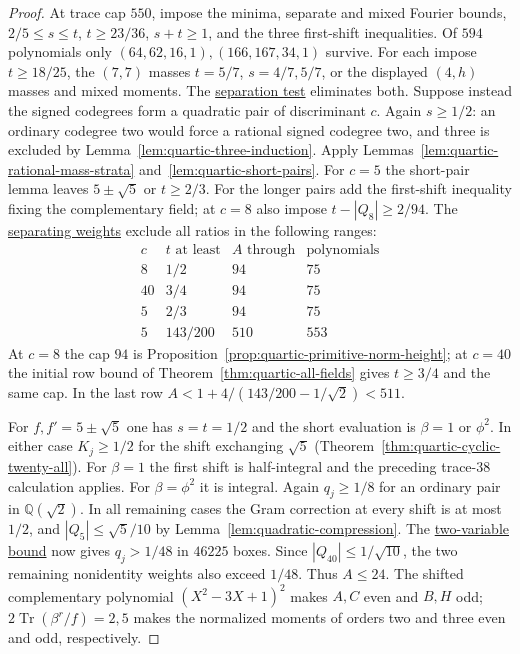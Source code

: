 \documentclass[11pt,reqno]{amsart}
\newcommand{\codecheck}[2]{\href{https://github.com/sebastienpalcoux/grothendieck-ring-classification/blob/d5750105bb5758f3ad38d2e5464dfcc12c019816/supplements/rank6/sphericality/#1}{#2}}
\theoremstyle{remark}\newtheorem{remark}[theorem]{Remark}
\numberwithin{equation}{section}
\begin{document}
\begin{proof}
At trace cap $550$, impose the minima, separate and mixed Fourier
bounds, $2/5\le s\le t$, $t\ge23/36$, $s+t\ge1$, and the three
first-shift inequalities. Of $594$ polynomials only
$(64,62,16,1),(166,167,34,1)$ survive. For each impose $t\ge18/25$,
the $(7,7)$ masses $t=5/7$, $s=4/7,5/7$, or the displayed
$(4,h)$ masses and mixed moments. The
\codecheck{quartic_more/silvergold.py}{separation test} eliminates both.
Suppose instead the signed codegrees form a quadratic pair of
discriminant $c$. Again $s\ge1/2$: an ordinary codegree two would
force a rational signed codegree two, and three is excluded by
Lemma~\ref{lem:quartic-three-induction}. Apply
Lemmas~\ref{lem:quartic-rational-mass-strata} and~\ref{lem:quartic-short-pairs}.
For $c=5$ the short-pair lemma leaves $5\pm\sqrt5$ or $t\ge2/3$.
For the longer pairs add the first-shift inequality fixing the
complementary field; at $c=8$ also impose $t-|Q_8|\ge2/94$.
The \codecheck{quartic_more/silvergold_duals.json}{separating weights}
exclude all ratios in the following ranges:
\[
\begin{array}{c|c|r|r}
 c&t\text{ at least}& A\text{ through}&\text{polynomials}\\\hline
 8&1/2&94&75\\ 40&3/4&94&75\\ 5&2/3&94&75\\ 5&143/200&510&553
\end{array}
\]
At $c=8$ the cap $94$ is Proposition~\ref{prop:quartic-primitive-norm-height};
at $c=40$ the initial row bound of Theorem~\ref{thm:quartic-all-fields}
gives $t\ge3/4$ and the same cap. In the last row
$A<1+4/(143/200-1/\sqrt2)<511$.

For $f,f'=5\pm\sqrt5$ one has $s=t=1/2$ and the short evaluation
is $\beta=1$ or $\phi^2$. In either case $K_j\ge1/2$ for the shift
exchanging $\sqrt5$ (Theorem~\ref{thm:quartic-cyclic-twenty-all}).
For $\beta=1$ the first shift is half-integral and the preceding
trace-$38$ calculation applies. For $\beta=\phi^2$ it is integral.
Again $q_j\ge1/8$ for an ordinary pair in $\mathbb Q(\sqrt2)$.
In all remaining cases the Gram correction at every shift is at most
$1/2$, and
$|Q_5|\le\sqrt5/10$ by Lemma~\ref{lem:quadratic-compression}.
The \codecheck{quartic_more/verify.py}{two-variable bound} now gives
$q_j>1/48$ in $46225$ boxes. Since $|Q_{40}|\le1/\sqrt{10}$,
the two remaining nonidentity weights also exceed $1/48$.
Thus $A\le24$. The shifted complementary polynomial $(X^2-3X+1)^2$
makes $A,C$ even and $B,H$ odd; $2\operatorname{Tr}(\beta^r/f)=2,5$
makes the normalized moments of orders two and three even and odd,
respectively.


\end{proof}
\end{document}
